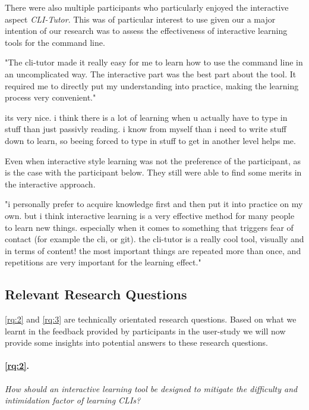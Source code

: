 There were also multiple participants who particularly enjoyed the interactive
aspect \textit{CLI-Tutor}. This was of particular interest to use given our a
major intention of our research was to assess the effectiveness of interactive
learning tools for the command line.

\begin{quotes}
	"The cli-tutor made it really easy for me to learn how to use the command line
	in an uncomplicated way. The interactive part was the best part about the tool.
	It required me to directly put my understanding into practice, making the
	learning process very convenient."
\end{quotes}

\begin{quotes}
	its very nice. i think there is a lot of learning when u actually have to type in stuff than just
	passivly reading. i know from myself than i need to write stuff down to learn, so beeing forced
	to type in stuff to get in another level helps me.
\end{quotes}

Even when interactive style learning was not the preference of the participant,
as is the case with the participant below. They still were able to find some
merits in the interactive approach.

\begin{quotes}
	"i personally prefer to acquire knowledge first and then put it into practice on my own. but i
	think interactive learning is a very effective method for many people to learn new things.
	especially when it comes to something that triggers fear of contact (for example the cli, or git).
	the cli-tutor is a really cool tool, visually and in terms of content! the most important things are
	repeated more than once, and repetitions are very important for the learning effect."
\end{quotes}

\subsection{Relevant Research Questions}

\ref{rq:2} and \ref{rq:3} are technically orientated research questions. Based
on what we learnt in the feedback provided by participants in the user-study we
will now provide some insights into potential answers to these research questions.


\paragraph{\ref{rq:2}.} \textit{How should an interactive learning tool be designed to mitigate
	the difficulty and intimidation factor of learning CLIs?}

